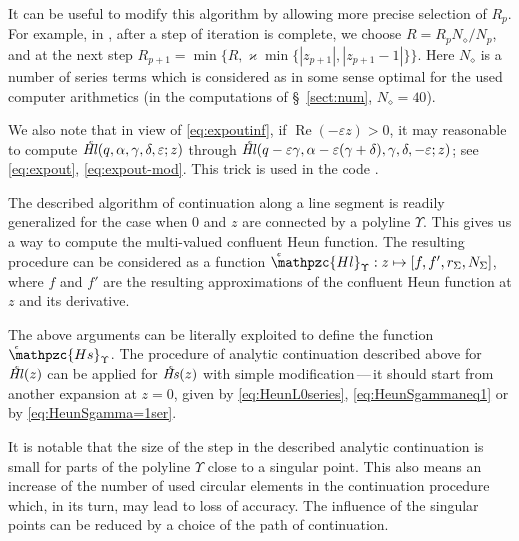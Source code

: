 \documentclass[11pt]{article}
\newcommand{\MF}[1]{\mathop{#1}\nolimits}
\renewcommand{\Re}{\MF{\mathrm{Re}}} \renewcommand{\Im}{\MF{\mathrm{Im}}}
\def\reservecoeff{\varkappa}
\def\HeunCl{\setbox0=\hbox{\tiny\itshape\bfseries \kern1.52mm c}\wd0=0pt\ht0=0pt\dp0=0pt\MF{\textit{\hbox{\raise1.67ex\copy0}Hl\/}}}%
\def\HeunCs{\setbox0=\hbox{\tiny\itshape\bfseries \kern1.52mm c}\wd0=0pt\ht0=0pt\dp0=0pt\MF{\textit{\hbox{\raise1.67ex\copy0}Hs\/}}}%
\def\psHeunClpath#1{\setbox0=\hbox{\tiny\itshape\bfseries \kern1.52mm c}\wd0=0pt\ht0=0pt\dp0=0pt\MF{\hbox{\raise1.67ex\copy0}\mathpzc{Hl}_{#1}}}%
\def\psHeunCspath#1{\setbox0=\hbox{\tiny\itshape\bfseries \kern1.52mm c}\wd0=0pt\ht0=0pt\dp0=0pt\MF{\hbox{\raise1.67ex\copy0}\mathpzc{Hs}_{#1}}}%
\begin{document}
It can be useful to modify this algorithm by allowing more precise selection of $R_p$. For example, in \cite{mycode2}, after a step of iteration is complete, we choose $R=R_p N_\diamond/N_p$, and at the next step $R_{p+1}=\min\bigl\{R,\reservecoeff\min\{|z_{p+1}|,|z_{p+1}-1|\}\bigr\}$. Here $N_\diamond$ is a number of series terms which is considered as in some sense optimal for the used computer arithmetics (in the computations of \S~\ref{sect:num}, $N_\diamond=40$).


We also note that in view of \eqref{eq:expoutinf}, if $\Re(-\varepsilon z)>0$, it may reasonable to compute $\HeunCl(q,\alpha,\gamma,\delta,\varepsilon;z)$ through $\HeunCl(q-\varepsilon\gamma,\alpha-\varepsilon(\gamma+\delta),\gamma,\delta,-\varepsilon;z)$; see \eqref{eq:expout}, \eqref{eq:expout-mod}. This trick is used in the code \cite{mycode2}.

The described algorithm of continuation along a line segment is readily
generalized for the case when $0$ and $z$ are connected by a polyline
$\Upsilon$. This gives us a way to compute the multi-valued confluent Heun function. The
resulting procedure can be considered as a function
$\psHeunClpath{\Upsilon}: z\mapsto [f,f',r_\Sigma,N_\Sigma]$,
where $f$ and $f'$ are the resulting approximations of the confluent Heun function at $z$
and its derivative. 

The above arguments can be literally exploited to define the function $\psHeunCspath{\Upsilon}$. The procedure of
analytic continuation described above for $\HeunCl(z)$ can be applied for $\HeunCs(z)$ with simple
modification\,---\,it should start from another expansion at $z=0$, given by \eqref{eq:HeunL0series}, \eqref{eq:HeunSgammaneq1} or by \eqref{eq:HeunSgamma=1ser}.

It is notable that the size of the step in the described analytic
continuation is small for parts of the polyline $\Upsilon$ close to a
singular point. This also means an increase of the number of used circular
elements in the continuation procedure which, in its turn, may lead to loss of
accuracy. The influence of the singular points can be reduced by a choice of the
path of continuation. 
\end{document}
